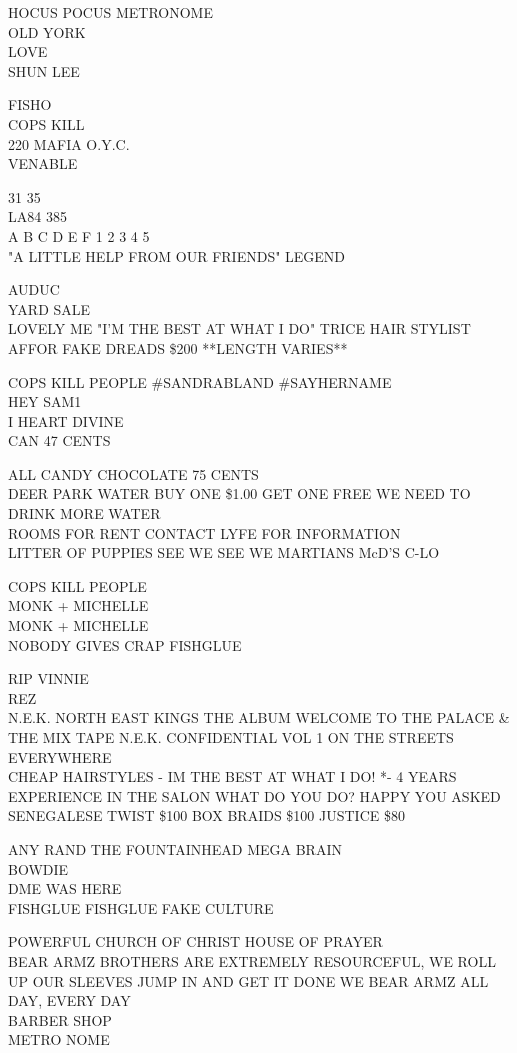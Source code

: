\documentclass[10pt,letterpaper]{article}
\begin{document}
HOCUS POCUS METRONOME\\
OLD YORK\\
LOVE\\
SHUN LEE

FISHO\\
COPS KILL\\
220 MAFIA O.Y.C.\\
VENABLE

31 35\\
LA84 385\\
A B C D E F 1 2 3 4 5\\
"A LITTLE HELP FROM OUR FRIENDS" LEGEND

AUDUC\\
YARD SALE\\
LOVELY ME "I'M THE BEST AT WHAT I DO" TRICE HAIR STYLIST\\
AFFOR FAKE DREADS \$200 **LENGTH VARIES**

COPS KILL PEOPLE \#SANDRABLAND \#SAYHERNAME\\
HEY SAM1\\
I HEART DIVINE\\
CAN 47 CENTS

ALL CANDY CHOCOLATE 75 CENTS\\
DEER PARK WATER BUY ONE \$1.00 GET ONE FREE WE NEED TO DRINK MORE WATER\\
ROOMS FOR RENT CONTACT LYFE FOR INFORMATION\\
LITTER OF PUPPIES SEE WE SEE WE MARTIANS McD'S C{-}LO

COPS KILL PEOPLE\\
MONK + MICHELLE\\
MONK + MICHELLE\\
NOBODY GIVES CRAP FISHGLUE

RIP VINNIE\\
REZ\\
N.E.K. NORTH EAST KINGS THE ALBUM WELCOME TO THE PALACE \& THE MIX TAPE N.E.K. CONFIDENTIAL VOL 1 ON THE STREETS EVERYWHERE\\
CHEAP HAIRSTYLES {-} IM THE BEST AT WHAT I DO!  *{-} 4 YEARS EXPERIENCE IN THE SALON WHAT DO YOU DO?  HAPPY YOU ASKED SENEGALESE TWIST \$100 BOX BRAIDS \$100 JUSTICE \$80

ANY RAND THE FOUNTAINHEAD MEGA BRAIN\\
BOWDIE\\
DME WAS HERE\\
FISHGLUE FISHGLUE FAKE CULTURE

POWERFUL CHURCH OF CHRIST HOUSE OF PRAYER\\
BEAR ARMZ BROTHERS ARE EXTREMELY RESOURCEFUL, WE ROLL UP OUR SLEEVES JUMP IN AND GET IT DONE WE BEAR ARMZ ALL DAY, EVERY DAY\\
BARBER SHOP\\
METRO NOME
\end{document}
